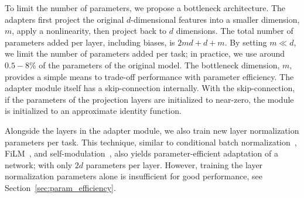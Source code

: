 To limit the number of parameters, we propose a bottleneck architecture.
The adapters first project the original $d$-dimensional features into a smaller dimension, $m$, apply a nonlinearity, then project back to $d$ dimensions.
The total number of parameters added per layer, including biases, is $2md+d+m$.
By setting $m\ll d$, we limit the number of parameters added per task;
in practice, we use around $0.5-8\%$ of the parameters of the original model.
The bottleneck dimension, $m$, provides a simple means to trade-off performance with parameter efficiency.
The adapter module itself has a skip-connection internally.
With the skip-connection, if the parameters of the projection layers are initialized to near-zero,
the module is initialized to an approximate identity function.

Alongside the layers in the adapter module, we also train new layer normalization parameters per task.
This technique, similar to conditional batch normalization~\citep{de2017modulating},
FiLM~\citep{perez2018}, and self-modulation~\citep{chen2019}, also yields parameter-efficient adaptation of a network; with only $2d$ parameters per layer.
However, training the layer normalization parameters alone is insufficient for good performance,
see Section~\ref{sec:param_efficiency}.
